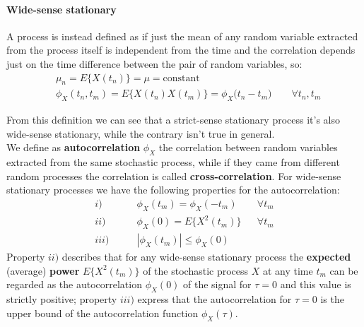 		\paragraph{Wide-sense stationary} A process is instead defined as  if just the mean of any random variable extracted from the process itself is independent from the time and the correlation depends just on the  time difference between the pair of random variables, so:
		\begin{align*}
			& \mu_n = E\{ X(t_n) \} = \mu = \textrm{constant} \\
			& \phi_X (t_n,t_m) = E\{ X(t_n) X(t_m) \} = \phi_X \big(t_n-t_m\big) \qquad \forall t_n,t_m
		\end{align*}
		
		From this definition we can see that a strict-sense stationary process it's also wide-sense stationary, while the contrary isn't true in general. \\
		We define as \textbf{autocorrelation} $\phi_X$ the correlation between random variables extracted from the same stochastic process, while if they came from different random processes the correlation is called \textbf{cross-correlation}. For wide-sense stationary processes we have the following properties for the autocorrelation:
		\begin{align*}
			i) \qquad & \phi_X (t_m) = \phi_X (-t_m) && \forall t_m \\
			ii) \qquad & \phi_X(0) = E\{ X^2(t_m)\} && \forall t_m \\
			iii) \qquad & |\phi_X(t_m)| \leq \phi_X(0)
		\end{align*}
		Property $ii)$ describes that for any wide-sense stationary process the \textbf{expected} (average) \textbf{power} $E\{X^2(t_m)\}$ of the stochastic process $X$ at any time $t_m$ can be regarded as the autocorrelation $\phi_X(0)$ of the signal for $\tau = 0$ and this value is strictly positive; property $iii)$ express that the autocorrelation for $\tau = 0$ is the upper bound of the autocorrelation function $\phi_X(\tau)$.
		
